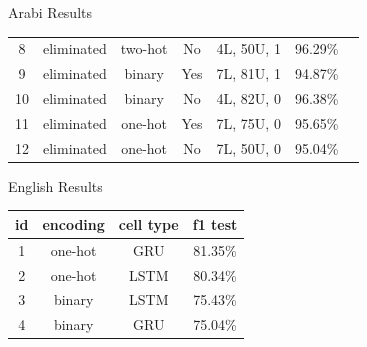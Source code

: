 \documentclass[10pt]{beamer}
\begin{document}
\begin{frame}[fragile]{Arabi Results}
\begin{center}
\begin{tabular}{c c c c c c c}
   \small{8} & \small{eliminated} & \small{two-hot} & \small{No}  &\small{4L, 50U, 1} & \small{96.29\%}\\ 
   \small{9} & \small{eliminated} & \small{binary} & \small{Yes} & \small{7L, 81U, 1} & \small{94.87\%}\\ 
   \small{10} & \small{eliminated} & \small{binary} & \small{No} & \small{4L, 82U, 0} & \small{96.38\%}\\ 
   \small{11} & \small{eliminated} & \small{one-hot} & \small{Yes} & \small{7L, 75U, 0} & \small{95.65\%}\\ 
   \small{12} & \small{eliminated} & \small{one-hot} & \small{No} & \small{7L, 50U, 0} & \small{95.04\%}\\ 


     \bottomrule
 \end{tabular}
\end{center}

\end{frame}

\begin{frame}[fragile]{English Results}
\begin{center}
 \begin{tabular}{c c c c} 
     \toprule
     \textbf{id} & \textbf{encoding } & \textbf{cell type} & \textbf{f1 test}\\
     \midrule
     1 & one-hot & GRU  & 81.35\%\\ %
     2 & one-hot & LSTM & 80.34\%\\ %
     3 & binary  & LSTM & 75.43\%\\ %
     4 & binary  & GRU  & 75.04\%\\ %

     \bottomrule
 \end{tabular}
\end{center}

\end{frame}
\end{document}

